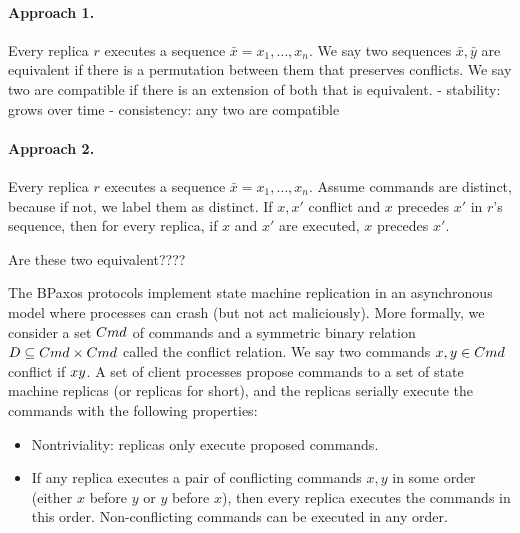 \paragraph{Approach 1.}
Every replica $r$ executes a sequence $\bar{x} = x_1, \ldots, x_n$. We say two
sequences $\bar{x}, \bar{y}$ are equivalent if there is a permutation between
them that preserves conflicts. We say two are compatible if there is an
extension of both that is equivalent.
  - stability: grows over time
  - consistency: any two are compatible


\paragraph{Approach 2.}
Every replica $r$ executes a sequence $\bar{x} = x_1, \ldots, x_n$. Assume
commands are distinct, because if not, we label them as distinct. If $x, x'$ conflict and $x$ precedes $x'$ in $r$'s sequence, then for every replica, if $x$ and $x'$ are executed, $x$ precedes $x'$.

Are these two equivalent????

The BPaxos protocols implement state machine replication in an asynchronous model where processes can crash (but not act maliciously). More formally, we consider a set $Cmd$ of commands and a symmetric binary relation $D \subseteq Cmd \times Cmd$ called the conflict relation. We say two commands $x, y \in Cmd$ conflict if $x  y$. A set of client processes propose commands to a set of state machine replicas (or replicas for short), and the replicas serially execute the commands with the following properties:

\begin{itemize}
  \item Nontriviality: replicas only execute proposed commands.
  \item If any replica executes a pair of conflicting commands $x, y$ in some order (either $x$ before $y$ or $y$ before $x$), then every replica executes the commands in this order. Non-conflicting commands can be executed in any order.
\end{itemize}

